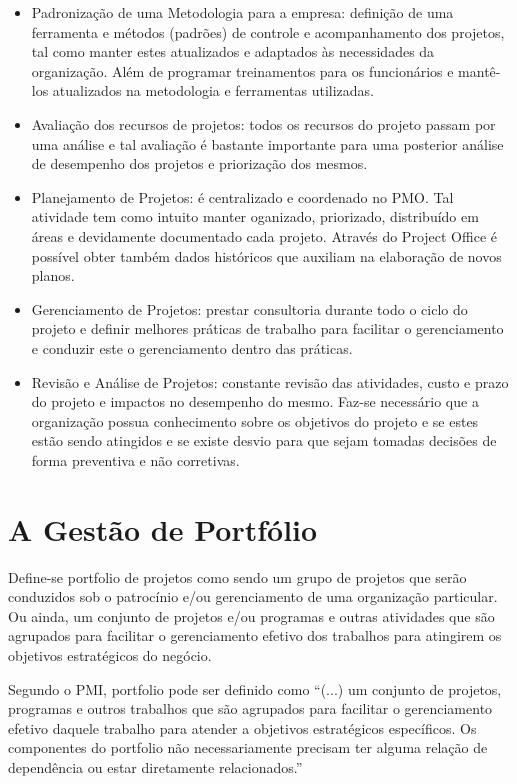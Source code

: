\documentclass[12pt,a4paper,ruledheader,tocpage=prefix,floatnumber=continuous,pagestart=folhaderosto,font=times]{abnt}
\begin{document}
\begin{itemize}
 \item Padronização de uma Metodologia para a empresa: definição de uma ferramenta e métodos (padrões) de controle e acompanhamento dos projetos, tal como
       manter estes atualizados e adaptados às necessidades da organização. Além de programar treinamentos para os funcionários e mantê-los atualizados
       na metodologia e ferramentas utilizadas.
 \item Avaliação dos recursos de projetos: todos os recursos do projeto passam por uma análise e tal avaliação é bastante importante para uma posterior 
       análise de desempenho dos projetos e priorização dos mesmos.
 \item Planejamento de Projetos: é centralizado e coordenado no PMO. Tal atividade tem como intuito manter oganizado, priorizado, distribuído em áreas
       e devidamente documentado cada projeto. Através do Project Office é possível obter também dados históricos que auxiliam na elaboração de novos planos.
 \item Gerenciamento de Projetos: prestar consultoria durante todo o ciclo do projeto e definir melhores práticas de trabalho para facilitar o gerenciamento
       e conduzir este o gerenciamento dentro das práticas.
 \item Revisão e Análise de Projetos: constante revisão das atividades, custo e prazo do projeto e impactos no desempenho do mesmo. Faz-se necessário que
       a organização possua conhecimento sobre os objetivos do projeto e se estes estão sendo atingidos e se existe desvio para que sejam tomadas decisões
       de forma preventiva e não corretivas.
\end{itemize}

\chapter{A Gestão de Portfólio}
Define-se portfolio de projetos como sendo um grupo de projetos que serão conduzidos sob o patrocínio e/ou gerenciamento de uma organização particular.  
Ou ainda, um conjunto de projetos e/ou programas e outras atividades que são agrupados para facilitar o gerenciamento efetivo dos trabalhos para 
atingirem os objetivos estratégicos do negócio.

Segundo o PMI, portfolio pode ser definido como ``(...) um conjunto de projetos, programas e outros trabalhos que são 
agrupados para facilitar o gerenciamento efetivo daquele trabalho para atender a objetivos estratégicos específicos. Os componentes do portfolio não 
necessariamente precisam ter alguma relação de dependência ou estar diretamente relacionados.''
\end{document}
